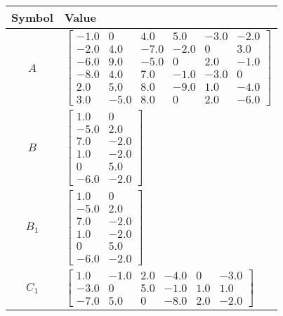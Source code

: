 \begin{tabular}{cl}
\hline
  Symbol  & Value                                                                                                                                                                                                                                                           \\
\hline
   $A$    & $\left[\begin{matrix}-1.0 & 0 & 4.0 & 5.0 & -3.0 & -2.0\\-2.0 & 4.0 & -7.0 & -2.0 & 0 & 3.0\\-6.0 & 9.0 & -5.0 & 0 & 2.0 & -1.0\\-8.0 & 4.0 & 7.0 & -1.0 & -3.0 & 0\\2.0 & 5.0 & 8.0 & -9.0 & 1.0 & -4.0\\3.0 & -5.0 & 8.0 & 0 & 2.0 & -6.0\end{matrix}\right]$ \\
   $B$    & $\left[\begin{matrix}1.0 & 0\\-5.0 & 2.0\\7.0 & -2.0\\1.0 & -2.0\\0 & 5.0\\-6.0 & -2.0\end{matrix}\right]$                                                                                                                                                      \\
 $B_{1}$  & $\left[\begin{matrix}1.0 & 0\\-5.0 & 2.0\\7.0 & -2.0\\1.0 & -2.0\\0 & 5.0\\-6.0 & -2.0\end{matrix}\right]$                                                                                                                                                      \\
 $C_{1}$  & $\left[\begin{matrix}1.0 & -1.0 & 2.0 & -4.0 & 0 & -3.0\\-3.0 & 0 & 5.0 & -1.0 & 1.0 & 1.0\\-7.0 & 5.0 & 0 & -8.0 & 2.0 & -2.0\end{matrix}\right]$                                                                                                              \\

\end{tabular}
